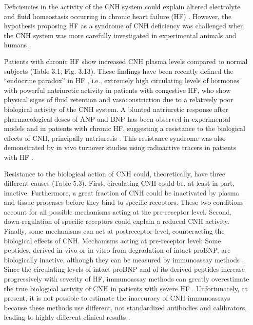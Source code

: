 \documentclass[14pt,a4paper,onecolumn]{extarticle}
\begin{document}
Deficiencies in the activity of the CNH system could explain altered electrolyte and
fluid homeostasis occurring in chronic heart failure (HF) \citep{bib324} \citep{bib325} \citep{bib326}. However, the hypothesis proposing HF as a syndrome of CNH deficiency was challenged when the CNH
system was more carefully investigated in experimental animals and humans \citep{bib324} \citep{bib325} \citep{bib326}.

Patients with chronic HF show increased CNH plasma levels compared to normal subjects (Table 3.1, Fig. 3.13). These findings have been recently defined the “endocrine
paradox” in HF \citep{bib36}, i.e., extremely high circulating levels of hormones with powerful natriuretic activity in patients with congestive HF, who show physical signs of fluid retention
and vasoconstriction due to a relatively poor biological activity of the CNH system.
A blunted natriuretic response after pharmacological doses of ANP and BNP has
been observed in experimental models and in patients with chronic HF, suggesting a
resistance to the biological effects of CNH, principally natriuresis \citep{bib324} \citep{bib325} \citep{bib326} \citep{bib327} \citep{bib328} \citep{bib329} \citep{bib330} \citep{bib331}. This resistance syndrome was also demonstrated by in vivo turnover studies using radioactive
tracers in patients with HF \citep{bib332} \citep{bib333}.

Resistance to the biological action of CNH could, theoretically, have three different
causes (Table 5.3). First, circulating CNH could be, at least in part, inactive. Furthermore, a great fraction of CNH could be inactivated by plasma and tissue proteases
before they bind to specific receptors. These two conditions account for all possible
mechanisms acting at the pre-receptor level. Second, down-regulation of specific receptors could explain a reduced CNH activity. Finally, some mechanisms can act at postreceptor level, counteracting the biological effects of CNH.
Mechanisms acting at pre-receptor level: Some peptides, derived in vivo or in vitro from
degradation of intact proBNP, are biologically inactive, although they can be measured
by immunoassay methods \citep{bib35} \citep{bib36} \citep{bib318}. Since the circulating levels of intact proBNP and of
its derived peptides increase progressively with severity of HF, immunoassay methods
can greatly overestimate the true biological activity of CNH in patients with severe HF
\citep{bib36}. Unfortunately, at present, it is not possible to estimate the inaccuracy of CNH
immunoassays because these methods use different, not standardized antibodies and
calibrators, leading to highly different clinical results \citep{bib35} \citep{bib36} \citep{bib318} \citep{bib334} \citep{bib335}.
\end{document}
